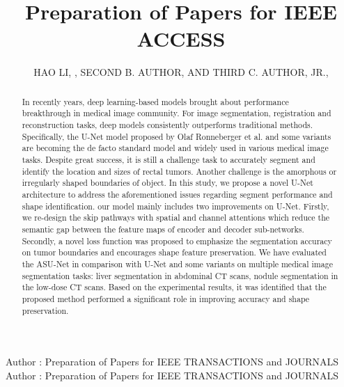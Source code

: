 \documentclass{ieeeaccess}
\begin{document}

\title{Preparation of Papers for IEEE ACCESS}
\author{\uppercase{Hao Li}, ,
\uppercase{Second B. Author, and Third C. Author,
Jr}.,
}
\address[1]{Beijing University of chemical and technology, Beijing, 10029 China (e-mail: 2018040206@mail.buct.edu.cn)}
\address[2]{Department of Physics, Colorado State University, Fort Collins, 
CO 80523 USA (e-mail: author@lamar.colostate.edu)}
\address[3]{Electrical Engineering Department, University of Colorado, Boulder, CO 
80309 USA}

\markboth
{Author \headeretal: Preparation of Papers for IEEE TRANSACTIONS and JOURNALS}
{Author \headeretal: Preparation of Papers for IEEE TRANSACTIONS and JOURNALS}


\begin{abstract}
  In recently years, deep learning-based models brought about performance breakthrough  in medical image community. For image segmentation, registration and reconstruction tasks, 
  deep models consistently outperforms traditional methods. Specifically, the U-Net model proposed by Olaf Ronneberger et al.\cite{RonnebergerFB15} and some variants are becoming the de facto standard model and widely 
  used in various medical image tasks. Despite great success, it is still a challenge task to accurately segment and identify the location and sizes of rectal tumors. 
  Another challenge is the amorphous or irregularly shaped boundaries of object. In this study, we propose a novel U-Net architecture to address the aforementioned issues regarding segment performance 
  and shape identification. our model mainly includes two improvements on U-Net. Firstly, we re-design the skip pathways with spatial and channel attentions which reduce the semantic gap between 
  the feature maps of encoder and decoder sub-networks. Secondly, a novel loss function was proposed to emphasize the segmentation accuracy on tumor boundaries and encourages shape feature preservation. 
  We have evaluated the ASU-Net in comparison with U-Net and some variants on multiple medical image segmentation tasks: liver segmentation in abdominal CT scans, nodule segmentation in the low-dose CT scans. 
  Based on the experimental results, it was identified that the proposed method performed a significant role in improving accuracy and shape preservation.
\end{abstract}
\end{document}
